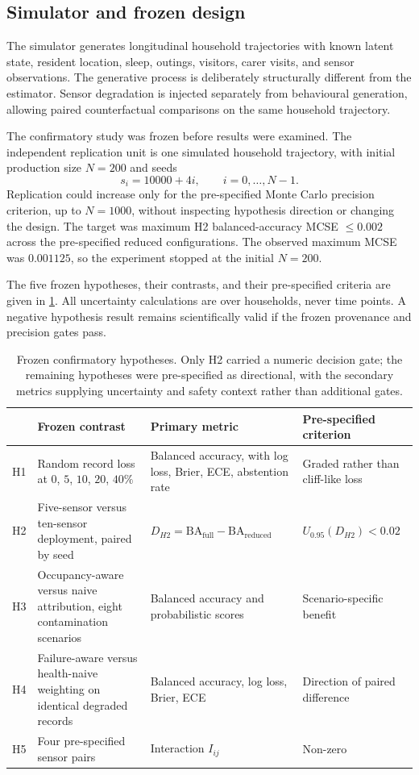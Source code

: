 \documentclass[11pt]{article}
\begin{document}
\subsection{Simulator and frozen design}

The simulator generates longitudinal household trajectories with known latent state, resident location, sleep, outings, visitors, carer visits, and sensor observations. The generative process is deliberately structurally different from the estimator. Sensor degradation is injected separately from behavioural generation, allowing paired counterfactual comparisons on the same household trajectory.

The confirmatory study was frozen before results were examined. The independent replication unit is one simulated household trajectory, with initial production size $N=200$ and seeds
\begin{equation}
s_i=10000+4i,\qquad i=0,\ldots,N-1.
\end{equation}
Replication could increase only for the pre-specified Monte Carlo precision criterion, up to $N=1000$, without inspecting hypothesis direction or changing the design. The target was maximum H2 balanced-accuracy MCSE $\leq0.002$ across the pre-specified reduced configurations. The observed maximum MCSE was $0.001125$, so the experiment stopped at the initial $N=200$.

The five frozen hypotheses, their contrasts, and their pre-specified criteria
are given in \cref{tab:hypotheses}. All uncertainty calculations are over
households, never time points. A negative hypothesis result remains
scientifically valid if the frozen provenance and precision gates pass.

\begin{table}[t]
\centering
\small
\caption{Frozen confirmatory hypotheses. Only H2 carried a numeric decision
gate; the remaining hypotheses were pre-specified as directional, with the
secondary metrics supplying uncertainty and safety context rather than
additional gates.}
\label{tab:hypotheses}
\begin{tabular}{@{}lp{3.5cm}p{3.6cm}p{3.1cm}@{}}
\toprule
& Frozen contrast & Primary metric & Pre-specified criterion \\
\midrule
H1 & Random record loss at $0$, $5$, $10$, $20$, $40\%$ & Balanced accuracy, with log loss, Brier, ECE, abstention rate & Graded rather than cliff-like loss \\
H2 & Five-sensor versus ten-sensor deployment, paired by seed & $D_{H2}=\mathrm{BA}_{\mathrm{full}}-\mathrm{BA}_{\mathrm{reduced}}$ & $U_{0.95}(D_{H2})<0.02$ \\
H3 & Occupancy-aware versus naive attribution, eight contamination scenarios & Balanced accuracy and probabilistic scores & Scenario-specific benefit \\
H4 & Failure-aware versus health-naive weighting on identical degraded records & Balanced accuracy, log loss, Brier, ECE & Direction of paired difference \\
H5 & Four pre-specified sensor pairs & Interaction $I_{ij}$ & Non-zero \\
\bottomrule
\end{tabular}
\end{table}
\end{document}
